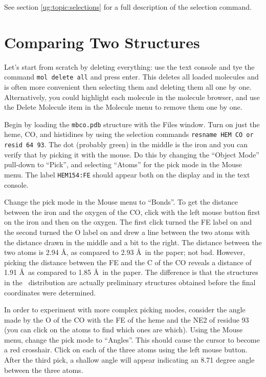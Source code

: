 See section \ref{ug:topic:selections}
for a full description of the selection command.

\section{Comparing Two Structures}

Let's start from scratch by deleting everything: use the text
console and tye the command {\tt mol delete all} and press enter.
This deletes all loaded molecules and is often more convenient
then selecting them and deleting them all one by one.  Alternatively,
you could highlight each molecule in the molecule browser, and
use the {\sf Delete Molecule} item in the {\sf Molecule} menu to 
remove them one by one.

Begin by loading the {\tt mbco.pdb} structure with the Files window.
Turn on just the heme, CO, and histidines by using the selection commands
{\tt resname HEM CO or resid 64 93}.  The dot (probably green) in the
middle is the iron and you can verify that by picking it with the
mouse.  Do this by changing the ``Object Mode'' pull-down to ``Pick'', and
selecting ``Atoms'' for the pick mode in the Mouse menu.
The label {\tt HEM154:FE} should appear both on the display
and in the text console.

Change the pick mode in the Mouse menu to ``Bonds''.
To get the distance between the iron and the oxygen of the CO, click
with the left mouse button first on the iron and then on the oxygen.
The first click turned the FE label on and the second turned the O
label on and drew a line between the two atoms with the distance drawn
in the middle and a bit to the right.  
The distance between the two
atoms is 2.94 \AA, as compared to 2.93 \AA\ in the paper; not bad.
However, picking the distance between the FE and the C of the CO
reveals a distance of 1.91 \AA\ as compared to 1.85 \AA\ in the paper.
The difference is that the structures in the \VMD\ distribution are
actually preliminary structures obtained before the final coordinates
were determined.

In order to experiment with more complex picking modes, 
consider the
angle made by the O of the CO with the FE of the heme and the NE2 of
residue 93 (you can click on the atoms to find which ones are which).
Using the Mouse menu, change the pick mode to ``Angles''.
This should cause the cursor to become a red crosshair.  
Click on each of the three atoms using the left mouse button.  After
the third pick, a shallow angle will appear indicating an 8.71 degree
angle between the three atoms.



